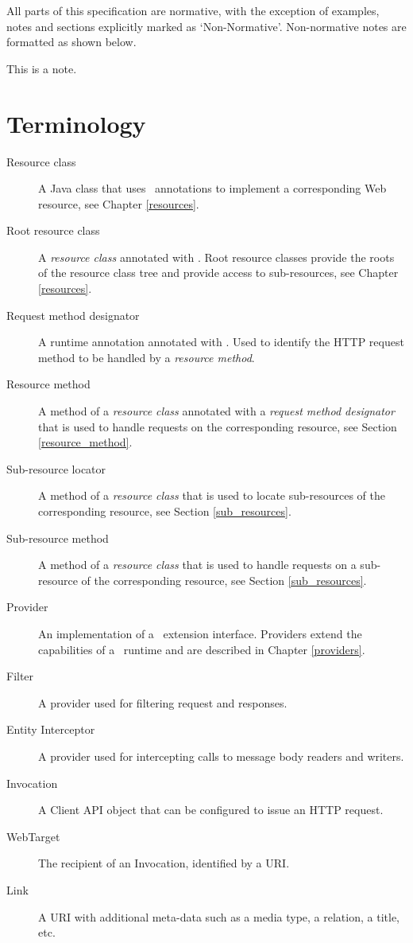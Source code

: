 All parts of this specification are normative, with the exception of examples, notes and sections explicitly marked as `Non-Normative'. Non-normative notes are formatted as shown below.

\begin{nnnote*}
This is a note.
\end{nnnote*}

\section{Terminology}
\label{terminology}

\begin{description}
\item[Resource class] A Java class that uses \jaxrs\ annotations to implement a corresponding Web resource, see Chapter \ref{resources}.
\item[Root resource class] A {\em resource class} annotated with \Path. Root resource classes provide the roots of the resource class tree and provide access to sub-resources, see Chapter \ref{resources}.
\item[Request method designator] A runtime annotation annotated with \HttpMethod. Used to identify the HTTP request method to be handled by a {\em resource method}.
\item[Resource method] A method of a {\em resource class} annotated with a {\em request method designator} that is used to handle requests on the corresponding resource, see Section \ref{resource_method}.
\item[Sub-resource locator] A method of a {\em resource class} that is used to locate sub-resources of the corresponding resource, see Section \ref{sub_resources}.
\item[Sub-resource method] A method of a {\em resource class} that is used to handle requests on a sub-resource of the corresponding resource, see Section \ref{sub_resources}.
\item[Provider] An implementation of a \jaxrs\ extension interface. Providers extend the capabilities of a \jaxrs\ runtime and are described in Chapter \ref{providers}.
\item[Filter] A provider used for filtering request and responses.
\item[Entity Interceptor] A provider used for intercepting calls to message body readers and writers.
\item[Invocation] A Client API object that can be configured to issue an HTTP request.
\item[WebTarget] The recipient of an Invocation, identified by a URI.
\item[Link] A URI with additional meta-data such as a media type, a relation, a title, etc.

\end{description}

